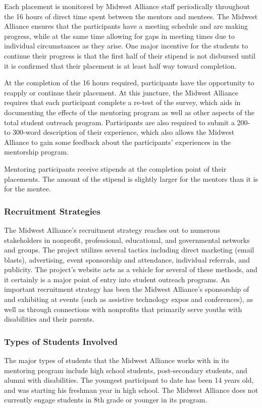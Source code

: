 \documentclass[11.5pt]{sig-alternate} %
\begin{document}
\begin{large}
Each placement is monitored by Midwest Alliance staff periodically throughout the 16 hours of direct time spent between the mentors and mentees. The Midwest Alliance ensures that the participants have a meeting schedule and are making progress, while at the same time allowing for gaps in meeting times due to individual circumstances as they arise. One major incentive for the students to continue their progress is that the first half of their stipend is not disbursed until it is confirmed that their placement is at least half way toward completion.

At the completion of the 16 hours required, participants have the opportunity to reapply or continue their placement. At this juncture, the Midwest Alliance requires that each participant complete a re-test of the survey, which aids in documenting the effects of the mentoring program as well as other aspects of the total student outreach program. Participants are also required to submit a 200- to 300-word description of their experience, which also allows the Midwest Alliance to gain some feedback about the participants' experiences in the mentorship program.

Mentoring participants receive stipends at the completion point of their placements. The amount of the stipend is slightly larger for the mentors than it is for the mentee.

\subsubsection*{Recruitment Strategies}
The Midwest Alliance's recruitment strategy reaches out to numerous stakeholders in nonprofit, professional, educational, and governmental networks and groups. The project utilizes several tactics including direct marketing (email blasts), advertising, event sponsorship and attendance, individual referrals, and publicity. The project's website acts as a vehicle for several of these methods, and it certainly is a major point of entry into student outreach programs. An important recruitment strategy has been the Midwest Alliance's sponsorship of and exhibiting at events (such as assistive technology expos and conferences), as well as through connections with nonprofits that primarily serve youths with disabilities and their parents.

\subsubsection*{Types of Students Involved}
The major types of students that the Midwest Alliance works with in its mentoring program include high school students, post-secondary students, and alumni with disabilities. The youngest participant to date has been 14 years old, and was starting his freshman year in high school. The Midwest Alliance does not currently engage students in 8th grade or younger in its program.


\end{large}
\end{document}
